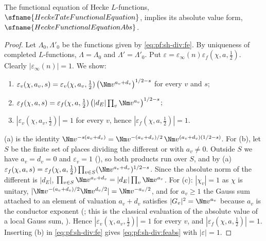 \begin{proposition}\label{pf:sh-div:feabs}
The functional equation of Hecke $L$-functions, $\sfname{HeckeTateFunctionalEquation}$, implies its absolute value form,
$\sfname{HeckeFunctionalEquationAbs}$.
\end{proposition}

\begin{proof}
Let $\Lambda_0,\Lambda'_0$ be the functions given by \eqref{eq:pf:sh-div:fe}. By uniqueness of completed $L$-functions,
$\Lambda=\Lambda_0$ and $\Lambda'=\Lambda'_0$. Put $\varepsilon=\varepsilon_\infty(n)\varepsilon_f(\chi,a,\frac12)$. Clearly
$|\varepsilon_\infty(n)|=1$. We show:
\begin{enumerate}[label=(\alph*)]
\item $\varepsilon_v(\chi,a_v,s)=\varepsilon_v(\chi,a_v,\tfrac12)\,\bigl(\Nm v^{a_v+d_v}\bigr)^{1/2-s}$ for every $v$ and $s$;
\item $\varepsilon_f(\chi,a,s)=\varepsilon_f(\chi,a,\tfrac12)\,\bigl(|d_E|\prod_v\Nm v^{a_v}\bigr)^{1/2-s}$;
\item $|\varepsilon_v(\chi,a_v,\tfrac12)|=1$ for every $v$, hence $|\varepsilon_f(\chi,a,\tfrac12)|=1$.
\end{enumerate}
(a) is the identity $\Nm v^{-s(a_v+d_v)}=\Nm v^{-(a_v+d_v)/2}\,\Nm v^{(a_v+d_v)(1/2-s)}$.
For (b), let $S$ be the finite set of places dividing the different or with $a_v\ne0$. Outside $S$ we have $a_v=d_v=0$ and
$\varepsilon_v=1$ (), so both products run over $S$, and by (a)
$\varepsilon_f(\chi,a,s)=\varepsilon_f(\chi,a,\frac12)\prod_{v\in S}(\Nm v^{a_v+d_v})^{1/2-s}$. Since the absolute norm of the different
is $|d_E|$, $\prod_{v\in S}\Nm v^{a_v+d_v}=|d_E|\prod_v\Nm v^{a_v}$.
For (c): $|\chi_v|=1$ as $\chi$ is unitary, $|\Nm v^{-(a_v+d_v)/2}\Nm v^{d_v/2}|=\Nm v^{-a_v/2}$, and for $a_v\ge1$ the Gauss sum
attached to an element of valuation $a_v+d_v$ satisfies $|G_v|^2=\Nm v^{a_v}$ because $a_v$ is the conductor exponent
(; this is the classical evaluation of the absolute value of
a local Gauss sum, \cite[Ch.~2]{Tate1967thesis}). Hence $|\varepsilon_v(\chi,a_v,\frac12)|=1$ for every $v$, and $|\varepsilon_f(\chi,a,\frac12)|=1$.
Inserting (b) in \eqref{eq:pf:sh-div:fe} gives \eqref{eq:pf:sh-div:feabs} with $|\varepsilon|=1$.
\end{proof}


